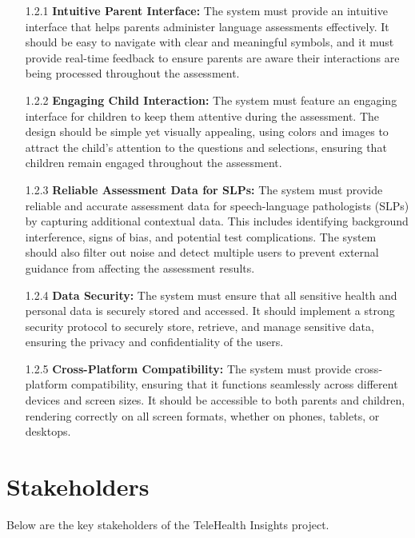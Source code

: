 \documentclass[12pt]{article}
\begin{document}
\begin{itemize}
  \item[1.2.1] \textbf{Intuitive Parent Interface:}  
  The system must provide an intuitive interface that helps parents administer 
  language assessments effectively. It should be easy to navigate with clear and 
  meaningful symbols, and it must provide real-time feedback to ensure parents are 
  aware their interactions are being processed throughout the assessment.

  \item[1.2.2] \textbf{Engaging Child Interaction:}  
  The system must feature an engaging interface for children to keep them attentive 
  during the assessment. The design should be simple yet visually appealing, using 
  colors and images to attract the child’s attention to the questions and selections,
  ensuring that children remain engaged throughout the assessment.

  \item[1.2.3] \textbf{Reliable Assessment Data for SLPs:}  
  The system must provide reliable and accurate assessment data for speech-language 
  pathologists (SLPs) by capturing additional contextual data. This includes 
  identifying background interference, signs of bias, and potential test 
  complications. The system should also filter out noise and detect multiple users 
  to prevent external guidance from affecting the assessment results.

  \item[1.2.4] \textbf{Data Security:}  
  The system must ensure that all sensitive health and personal data is securely 
  stored and accessed. It should implement a strong security protocol to securely 
  store, retrieve, and manage sensitive data, ensuring the privacy and confidentiality
  of the users.

  \item[1.2.5] \textbf{Cross-Platform Compatibility:}  
  The system must provide cross-platform compatibility, ensuring that it functions 
  seamlessly across different devices and screen sizes. It should be accessible to 
  both parents and children, rendering correctly on all screen formats, whether on 
  phones, tablets, or desktops.
\end{itemize}

\newpage

\section{Stakeholders}
\hspace{2em}Below are the key stakeholders of the TeleHealth Insights project.
\end{document}
